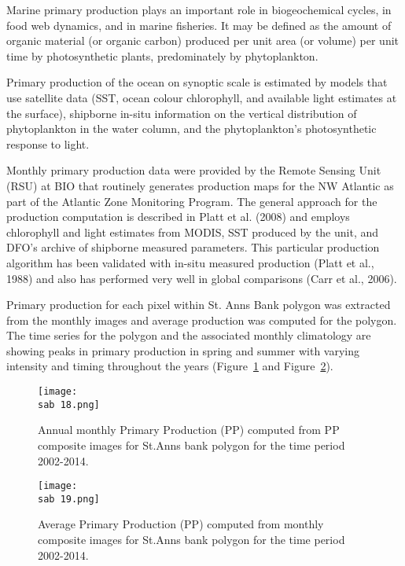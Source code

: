 \documentclass[letterpaper,portrait,11pt]{scrartcl}
\numberwithin{equation}{section}		%
\numberwithin{figure}{section}		%
\numberwithin{table}{section}				%
\newcommand{\ecomod}{\string~/ecomod_data/}   %
\newcommand{\sab}{\ecomod/mpa/sab/}   %
\begin{document}
Marine primary production plays an important role in biogeochemical cycles, in food web dynamics, and in marine fisheries. It may be defined as the amount of organic material (or organic carbon) produced per unit area (or volume) per unit time by photosynthetic plants, predominately by phytoplankton.

Primary production of the ocean on synoptic scale is estimated by models that use satellite data (SST, ocean colour chlorophyll, and available light estimates at the surface), shipborne in-situ information on the vertical distribution of phytoplankton in the water column, and the phytoplankton’s photosynthetic response to light.

Monthly primary production data were provided by the Remote Sensing Unit (RSU) at BIO that routinely generates production maps for the NW Atlantic as part of the Atlantic Zone Monitoring Program. The general approach for the production computation is described in Platt et al. (2008) and employs chlorophyll and light estimates from MODIS, SST produced by the unit, and DFO’s archive of shipborne measured parameters. This particular production algorithm has been validated with in-situ measured production (Platt et al., 1988) and also has performed very well in global comparisons (Carr et al., 2006).

Primary production for each pixel within St. Anns Bank polygon was extracted from the monthly images and average production was computed for the polygon. The time series for the polygon and the associated monthly climatology are showing peaks in primary production in spring and summer with varying intensity and timing throughout the years (Figure~\ref{fig:ppTSmonthly} and Figure~\ref{fig:ppTSannual}). 


\begin{figure}[h]
  \label{fig:ppTSmonthly}
  \centering
  \texttt{[image: \\sab 18.png]}
  \caption{Annual monthly Primary Production (PP) computed from PP composite images for St.Anns bank polygon for the time period 2002-2014.}
\end{figure}


\begin{figure}[h]
  \label{fig:ppTSannual}
  \centering
  \texttt{[image: \\sab 19.png]}
  \caption{Average Primary Production (PP) computed from monthly composite images for St.Anns bank polygon for the time period 2002-2014.}
\end{figure}

\clearpage
\end{document}
